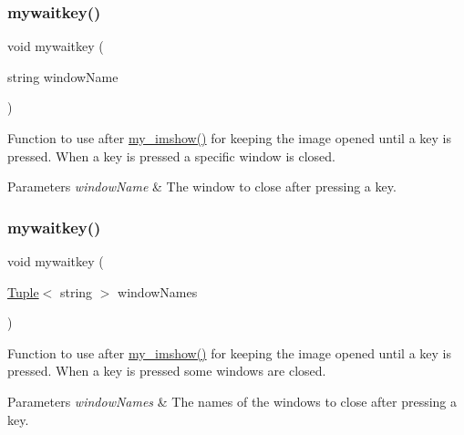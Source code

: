 \mbox{\label{utils_8hh_a31ae190fba03c3a422a13a4271e0e424}} 
\subsubsection{\texorpdfstring{mywaitkey()}{mywaitkey()}\hspace{0.1cm}{\footnotesize\ttfamily [2/3]}}
{\footnotesize\ttfamily void mywaitkey (\begin{DoxyParamCaption}\item[{string}]{window\+Name }\end{DoxyParamCaption})}



Function to use after \mbox{\hyperlink{utils_8hh_aabfea83501dfccfa4c420b8c19ceefd7}{my\+\_\+imshow()}} for keeping the image opened until a key is pressed. When a key is pressed a specific window is closed. 


\begin{DoxyParams}{Parameters}
{\em window\+Name} & The window to close after pressing a key. \\
\hline
\end{DoxyParams}
\mbox{\label{utils_8hh_a0807d925012933fcd1df713f65e35d6b}} 
\subsubsection{\texorpdfstring{mywaitkey()}{mywaitkey()}\hspace{0.1cm}{\footnotesize\ttfamily [3/3]}}
{\footnotesize\ttfamily void mywaitkey (\begin{DoxyParamCaption}\item[{\mbox{\hyperlink{class_tuple}{Tuple}}$<$ string $>$}]{window\+Names }\end{DoxyParamCaption})}



Function to use after \mbox{\hyperlink{utils_8hh_aabfea83501dfccfa4c420b8c19ceefd7}{my\+\_\+imshow()}} for keeping the image opened until a key is pressed. When a key is pressed some windows are closed. 


\begin{DoxyParams}{Parameters}
{\em window\+Names} & The names of the windows to close after pressing a key. \\
\hline
\end{DoxyParams}
